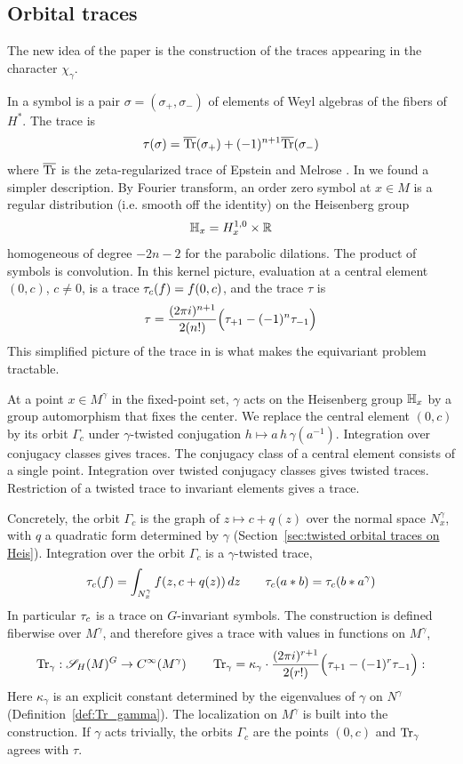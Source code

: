\documentclass[11pt]{amsart}
\theoremstyle{plain}
\theoremstyle{definition}
\theoremstyle{remark}
\begin{document}
\subsection{Orbital traces}\label{sec:intro traces}
The new idea of the paper is the construction of the traces appearing in the character $\chi_\gamma$.

In \cite{GvE20} a symbol is a pair $\sigma=(\sigma_+,\sigma_-)$ of elements of Weyl algebras of the fibers of $H^*$. The trace is 
\[\tau(\sigma)={\overline{\mathrm{Tr}}}(\sigma_+)+(-1)^{n+1}{\overline{\mathrm{Tr}}}(\sigma_-)\]
where ${\overline{\mathrm{Tr}}}$ is the zeta-regularized trace of Epstein and Melrose \cite{EMxx}.
In \cite{GvE25} we found a simpler description.
By Fourier transform, an order zero symbol at $x\in M$ is a regular distribution (i.e. smooth off the identity) on the Heisenberg group 
\[ \mathbb{H}_x=H_x^{1,0}\times {\mathbb{R}}\]
homogeneous of degree $-2n-2$ for the parabolic dilations.
The product of symbols is convolution.
In this kernel picture, evaluation at a central element $(0,c)$, $c\ne0$, is a trace $\tau_{c}(f)=f(0,c)$, and the trace $\tau$ is
\[ \tau = \frac{(2\pi i)^{n+1}}{2(n!)}\Bigl(\tau_{+1}-(-1)^n\tau_{-1}\Bigr)\]
This simplified picture of the trace in \cite{GvE25} is what makes the equivariant problem tractable.

At a point $x\in M^\gamma$ in the fixed-point set, $\gamma$ acts on the Heisenberg group $\mathbb{H}_x$ by a group automorphism that fixes the center.
We replace the central element $(0,c)$ by its orbit $\Gamma_c$ under $\gamma$-twisted conjugation $h\mapsto a\,h\,\gamma(a^{-1})$.
Integration over conjugacy classes  gives traces.
The conjugacy class of a central element consists of a single point.
Integration over twisted conjugacy classes gives twisted traces.
Restriction of a twisted trace to invariant elements gives a trace.

Concretely, the orbit $\Gamma_c$ is the graph of $z\mapsto c+q(z)$ over the normal space $N^\gamma_x$, with $q$ a quadratic form determined by $\gamma$ (Section~\ref{sec:twisted orbital traces on Heis}).
Integration over the orbit $\Gamma_c$ is a $\gamma$-twisted trace,
\[ \tau_{c}(f)=\int_{N^\gamma_x}f(z,c+q(z))\,dz\qquad \tau_{c}(a*b)=\tau_{c}(b*a^\gamma)\]
In particular $\tau_{c}$ is a trace on $G$-invariant symbols.
The construction is defined fiberwise over $M^\gamma$, and therefore gives a trace  with values in functions on $M^\gamma$,
\[ \operatorname{Tr}_\gamma:{\mathscr{S}_H}(M)^G\to C^\infty(M^\gamma)\qquad \operatorname{Tr}_\gamma = \kappa_\gamma \cdot \frac{(2\pi i)^{r+1}}{2(r!)}\Bigl(\tau_{+1}-(-1)^r\tau_{-1}\Bigr):\]
Here $\kappa_\gamma$ is an explicit constant determined by the eigenvalues of $\gamma$ on $N^\gamma$ (Definition~\ref{def:Tr_gamma}).
The localization on $M^\gamma$ is built into the construction.
If $\gamma$ acts trivially, the orbits $\Gamma_c$ are the points $(0,c)$ and $\operatorname{Tr}_\gamma$ agrees with $\tau$.
\end{document}
